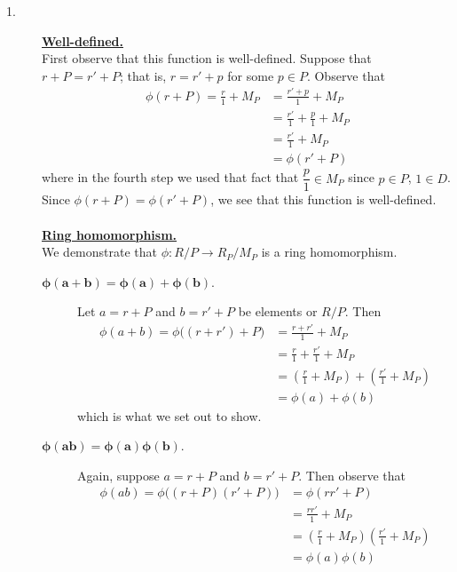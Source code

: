 \begin{prf}
    \begin{description}
    \item[1.]     \underline{\textbf{Well-defined.}}\\ First observe that this function is
    well-defined. Suppose that $r + P = r' + P$; that is, $r = r'
    + p$ for some $p \in P$. Observe that 
    \begin{align*}
        \phi(r + P) = \frac{r}{1} + M_P
        &= \frac{r' + p}{1} + M_P\\
        &= \frac{r'}{1} + \frac{p}{1} + M_P\\
        &= \frac{r'}{1} + M_P\\
        &= \phi(r' + P)
    \end{align*}
    where in the fourth step we used that fact that $\dfrac{p}{1}
    \in M_P$ since $p \in P$, $1 \in D$. Since $\phi(r + P) =
    \phi(r' + P)$, we see that
    this function is well-defined. 
    \\
    \\
    \underline{\textbf{Ring homomorphism.}}\\
    We demonstrate that $\phi: R/P \to R_P/M_P$ is a ring
    homomorphism. 
    \begin{description}
        \item[$\bm{\phi(a + b) = \phi(a) + \phi(b)}$.]
        Let $a = r + P$ and $b = r' + P$ be elements or $R/P$.
        Then
        \begin{align*}
            \phi(a + b) = \phi\big((r + r') + P \big)
            & = \frac{r + r'}{1} + M_P\\
            & = \frac{r}{1} + \frac{r'}{1} + M_P\\
            & = \left( \frac{r}{1} + M_P\right) + \left(\frac{r'}{1} + M_P\right)\\
            & = \phi(a) + \phi(b)
        \end{align*}    
        which is what we set out to show.
        \item[$\bm{\phi(ab) = \phi(a)\phi(b)}$.] Again, suppose $a
        = r + P$ and $b = r' + P$. Then observe that 
        \begin{align*}
            \phi(ab) = \phi\big( (r + P)(r' + P) \big) & = \phi(rr' + P)\\
            & = \frac{rr'}{1} + M_P\\
            & = \left(\frac{r}{1} + M_P\right)\left(\frac{r'}{1} + M_P\right)\\
            & = \phi(a)\phi(b)

\end{align*}
\end{description}
\end{description}
\end{prf}
